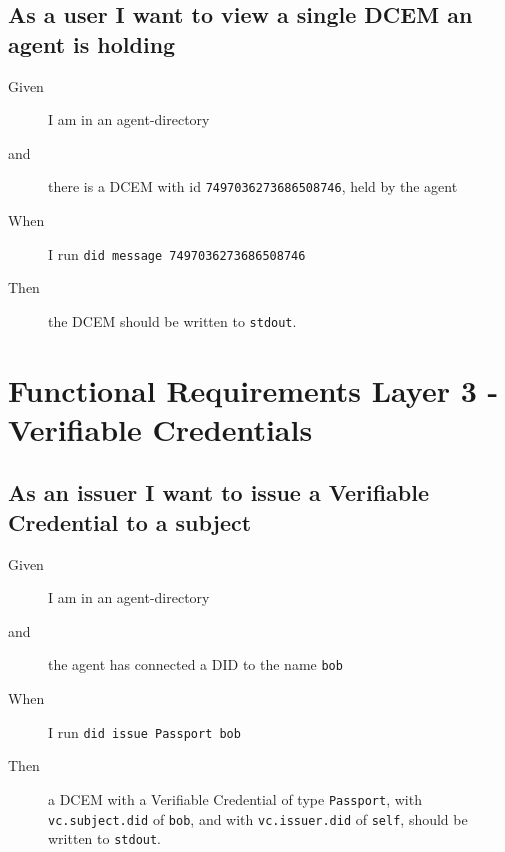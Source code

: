 \subsection{As a user I want to view a single DCEM an agent is holding}
\begin{description}
    \item[Given] I am in an agent-directory
    \item[and] there is a DCEM with id \texttt{7497036273686508746}, held by the agent
    \item[When] I run \texttt{did message 7497036273686508746}
    \item[Then] the DCEM should be written to \texttt{stdout}.
\end{description}



\newpage



\section{Functional Requirements Layer 3 - Verifiable Credentials}



\subsection{As an issuer I want to issue a Verifiable Credential to a subject}
\begin{description}
    \item[Given] I am in an agent-directory
    \item[and] the agent has connected a DID to the name \texttt{bob}
    \item[When] I run \texttt{did issue Passport bob}
    \item[Then] a DCEM with a Verifiable Credential of type \texttt{Passport}, with \texttt{vc.subject.did} of \texttt{bob}, and with \texttt{vc.issuer.did} of \texttt{self}, should be written to \texttt{stdout}.
\end{description}



